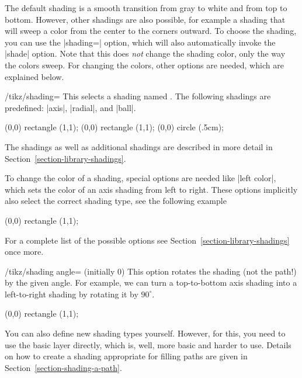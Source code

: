The default shading is a smooth transition from gray to white and from top to
bottom. However, other shadings are also possible, for example a shading that
will sweep a color from the center to the corners outward. To choose the
shading, you can use the |shading=| option, which will also automatically
invoke the |shade| option. Note that this does \emph{not} change the shading
color, only the way the colors sweep. For changing the colors, other options
are needed, which are explained below.

\begin{key}{/tikz/shading=}
    This selects a shading named . The following shadings are
    predefined: |axis|, |radial|, and |ball|.
\begin{codeexample}[]
\tikz \shadedraw [shading=axis] (0,0) rectangle (1,1);
\tikz \shadedraw [shading=radial] (0,0) rectangle (1,1);
\tikz \shadedraw [shading=ball] (0,0) circle (.5cm);
\end{codeexample}

    The shadings as well as additional shadings are described in more detail in
    Section~\ref{section-library-shadings}.

    To change the color of a shading, special options are needed like
    |left color|, which sets the color of an axis shading from left to right.
    These options implicitly also select the correct shading type, see the
    following example
\begin{codeexample}[]
\tikz \shadedraw [left color=red,right color=blue]
    (0,0) rectangle (1,1);
\end{codeexample}

    For a complete list of the possible options see
    Section~\ref{section-library-shadings} once more.

    \begin{key}{/tikz/shading angle= (initially 0)}
        This option rotates the shading (not the path!) by the given angle. For
        example, we can turn a top-to-bottom axis shading into a left-to-right
        shading by rotating it by $90^\circ$.
\begin{codeexample}[]
\tikz \shadedraw [shading=axis,shading angle=90] (0,0) rectangle (1,1);
\end{codeexample}
    \end{key}
\end{key}

You can also define new shading types yourself. However, for this, you need to
use the basic layer directly, which is, well, more basic and harder to use.
Details on how to create a shading appropriate for filling paths are given in
Section~\ref{section-shading-a-path}.


